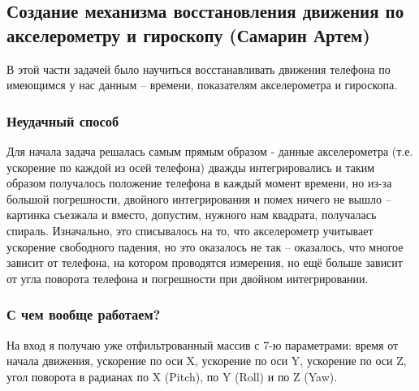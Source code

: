 \subsection{Создание механизма восстановления движения по акселерометру и гироскопу (Самарин Артем)}

В этой части задачей было научиться восстанавливать движения телефона по имеющимся у нас данным – времени, показателям акселерометра и гироскопа.

\subsubsection{Неудачный способ}

Для начала задача решалась самым прямым образом - данные акселерометра (т.е. ускорение по каждой из осей телефона) дважды интегрировались и таким образом получалось положение телефона в каждый момент времени, но из-за большой погрешности, двойного интегрирования и помех ничего не вышло – картинка съезжала и вместо, допустим, нужного нам квадрата, получалась спираль. Изначально, это списывалось на то, что акселерометр учитывает ускорение свободного падения, но это оказалось не так – оказалось, что многое зависит от телефона, на котором проводятся измерения, но ещё больше зависит от угла поворота телефона и погрешности при двойном интегрировании.

\subsubsection{С чем вообще работаем?}

На вход я получаю уже отфильтрованный массив с 7-ю параметрами: время от начала движения, ускорение по оси X, ускорение по оси Y, ускорение по оси Z, угол поворота в радианах по X (Pitch), по Y (Roll) и по Z (Yaw).

\begin{figure}[H]
\end{figure}

